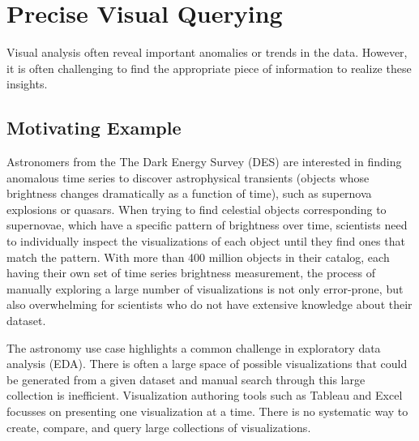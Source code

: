 \section{Precise Visual Querying\label{sec:precise}}
Visual analysis often reveal important anomalies or trends in the data\cite{Morton2014}. However, it is often challenging to find the appropriate piece of information to realize these insights.

\subsection{Motivating Example}
Astronomers from the The Dark Energy Survey (DES)\cite{Drlica-Wagner2017} are interested in finding anomalous time series to discover astrophysical transients (objects whose brightness changes dramatically as a function of time), such as supernova explosions or quasars. When trying to find celestial objects corresponding to supernovae, which have a specific pattern of brightness over time, scientists need to individually inspect the visualizations of each object until they find ones that match the pattern. With more than 400 million objects in their catalog, each having their own set of time series brightness measurement, the process of manually exploring a large number of visualizations is not only error-prone, but also overwhelming for scientists who do not have extensive knowledge about their dataset.  
\par The astronomy use case highlights a common challenge in exploratory data analysis (EDA). There is often a large space of possible visualizations that could be generated from a given dataset and manual search through this large collection is inefficient. Visualization authoring tools such as Tableau and Excel focusses on presenting one visualization at a time. There is no systematic way to create, compare, and query large collections of visualizations. 
